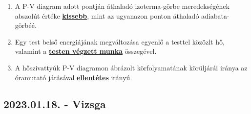 \documentclass[../../fizika_kerdesek.tex]{subfiles}
\begin{document}
{\begin{enumerate}
                \item A P-V diagram adott pontján áthaladó izoterma-görbe meredekségének abszolút értéke \underline{\textbf{kissebb}}, mint az ugyanazon ponton áthaladó adiabata-görbéé.
                \item Egy test belső energiájának megváltozása egyenlő a testtel közözlt hő, valamint a \underline{\textbf{testen végzett munka}} összegével.
                \item A hőszivattyúk P-V diagramon ábrázolt körfolyamatának körüljárái iránya az óramutató járásával \underline{\textbf{ellentétes}} irányú.
            \end{enumerate}}

    \subsection{2023.01.18. - Vizsga}
\end{document}
